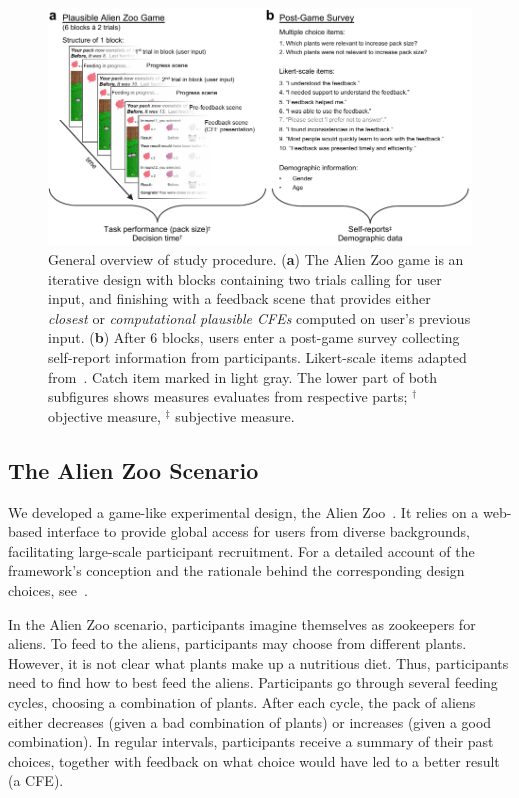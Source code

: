 \begin{figure}
   \centering
   \includegraphics[width=\textwidth]{./media/FigureStudyStructure.pdf}
   \caption{General overview of study procedure. (\textbf{a}) The Alien Zoo game is an iterative design with blocks containing two trials calling for user input, and finishing with a feedback scene that provides either \textit{closest} or \textit{computational plausible \glspl{CFE}} computed on user's previous input. (\textbf{b}) After 6 blocks, users enter a post-game survey collecting self-report information from participants. Likert-scale items adapted from~\citep{holzinger_measuring_2020}. Catch item marked in light gray. The lower part of both subfigures shows measures evaluates from respective parts; $^\dag$ objective measure, $^\ddag$ subjective measure.}
   \label{fig:StudyStructure}
 \end{figure}

\subsection{The Alien Zoo Scenario}

We developed a game-like experimental design, the Alien Zoo~\citep{IAZ ARXIV}.
It relies on a web-based interface to provide global access for users from diverse backgrounds, facilitating large-scale participant recruitment.
For a detailed account of the framework's conception and the rationale behind the corresponding design choices, see~\citet{IAZ ARXIV}.

In the Alien Zoo scenario, participants imagine themselves as zookeepers for aliens. 
To feed to the aliens, participants may choose from different plants. 
However, it is not clear what plants make up a nutritious diet. 
Thus, participants need to find how to best feed the aliens. 
Participants go through several feeding cycles, choosing a combination of plants. 
After each cycle, the pack of aliens either decreases (given a bad combination of plants) or increases (given a good combination). 
In regular intervals, participants receive a summary of their past choices, together with feedback on what choice would have led to a better result (\ie a \gls{CFE}).

